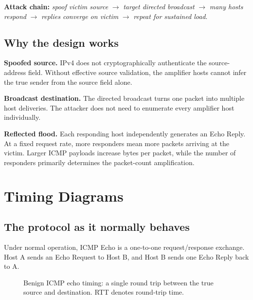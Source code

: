 \documentclass[12pt,a4paper]{article}
\begin{document}
\textbf{Attack chain:}\quad
\textit{spoof victim source}
$\rightarrow$
\textit{target directed broadcast}
$\rightarrow$
\textit{many hosts respond}
$\rightarrow$
\textit{replies converge on victim}
$\rightarrow$
\textit{repeat for sustained load}.

\subsection{Why the design works}
\textbf{Spoofed source.} IPv4 does not cryptographically authenticate the source-address field. Without effective source validation, the amplifier hosts cannot infer the true sender from the source field alone.

\textbf{Broadcast destination.} The directed broadcast turns one packet into multiple host deliveries. The attacker does not need to enumerate every amplifier host individually.

\textbf{Reflected flood.} Each responding host independently generates an Echo Reply. At a fixed request rate, more responders mean more packets arriving at the victim. Larger ICMP payloads increase bytes per packet, while the number of responders primarily determines the packet-count amplification.

\section{Timing Diagrams}
\subsection{The protocol as it normally behaves}
Under normal operation, ICMP Echo is a one-to-one request/response exchange. Host A sends an Echo Request to Host B, and Host B sends one Echo Reply back to A.

\begin{figure}[H]
\centering

\caption{Benign ICMP echo timing: a single round trip between the true source and destination. RTT denotes round-trip time.}
\end{figure}
\end{document}
